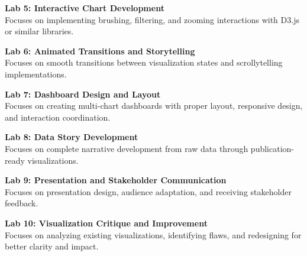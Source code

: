 \vspace{0.2cm}

\noindent\textbf{Lab 5: Interactive Chart Development} \\
Focuses on implementing brushing, filtering, and zooming interactions with D3.js or similar libraries.

\vspace{0.2cm}

\noindent\textbf{Lab 6: Animated Transitions and Storytelling} \\
Focuses on smooth transitions between visualization states and scrollytelling implementations.

\vspace{0.2cm}

\noindent\textbf{Lab 7: Dashboard Design and Layout} \\
Focuses on creating multi-chart dashboards with proper layout, responsive design, and interaction coordination.

\vspace{0.2cm}

\noindent\textbf{Lab 8: Data Story Development} \\
Focuses on complete narrative development from raw data through publication-ready visualizations.

\vspace{0.2cm}

\noindent\textbf{Lab 9: Presentation and Stakeholder Communication} \\
Focuses on presentation design, audience adaptation, and receiving stakeholder feedback.

\vspace{0.2cm}

\noindent\textbf{Lab 10: Visualization Critique and Improvement} \\
Focuses on analyzing existing visualizations, identifying flaws, and redesigning for better clarity and impact.

\vspace{0.2cm}

\newpage
{}
